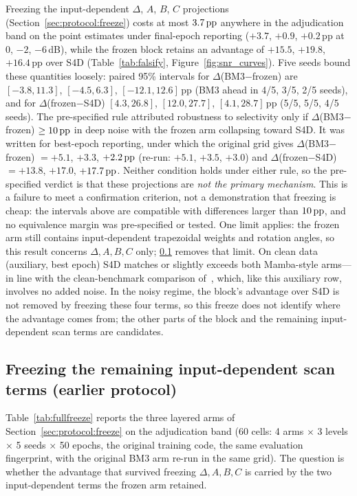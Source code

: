 Freezing the input-dependent $\Delta$, $A$, $B$, $C$ projections (Section~\ref{sec:protocol:freeze}) costs at most $3.7\,\mathrm{pp}$ anywhere in the adjudication band on the point estimates under final-epoch reporting ($+3.7$, $+0.9$, $+0.2$\,pp at $0$, $-2$, $-6$\,dB), while the frozen block retains an advantage of $+15.5$, $+19.8$, $+16.4$\,pp over S4D (Table~\ref{tab:falsify}, Figure~\ref{fig:snr_curves}). Five seeds bound these quantities loosely: paired 95\% intervals for $\Delta$(BM3$-$frozen) are $[-3.8, 11.3]$, $[-4.5, 6.3]$, $[-12.1, 12.6]$\,pp (BM3 ahead in 4/5, 3/5, 2/5 seeds), and for $\Delta$(frozen$-$S4D) $[4.3, 26.8]$, $[12.0, 27.7]$, $[4.1, 28.7]$\,pp (5/5, 5/5, 4/5 seeds). The pre-specified rule attributed robustness to selectivity only if $\Delta$(BM3$-$frozen) $\geq 10\,\mathrm{pp}$ in deep noise with the frozen arm collapsing toward S4D. It was written for best-epoch reporting, under which the original grid gives $\Delta$(BM3$-$frozen) $= +5.1$, $+3.3$, $+2.2\,\mathrm{pp}$ (re-run: $+5.1$, $+3.5$, $+3.0$) and $\Delta$(frozen$-$S4D) $= +13.8$, $+17.0$, $+17.7\,\mathrm{pp}$. Neither condition holds under either rule, so the pre-specified verdict is that these projections are \emph{not the primary mechanism}. This is a failure to meet a confirmation criterion, not a demonstration that freezing is cheap: the intervals above are compatible with differences larger than $10\,\mathrm{pp}$, and no equivalence margin was pre-specified or tested. One limit applies: the frozen arm still contains input-dependent trapezoidal weights and rotation angles, so this result concerns $\Delta, A, B, C$ only; \ref{sec:results:fullfreeze} removes that limit. On clean data (auxiliary, best epoch) S4D matches or slightly exceeds both Mamba-style arms---in line with the clean-benchmark comparison of~\cite{saadatmand2026s4d}, which, like this auxiliary row, involves no added noise. In the noisy regime, the block's advantage over S4D is not removed by freezing these four terms, so this freeze does not identify where the advantage comes from; the other parts of the block and the remaining input-dependent scan terms are candidates.

\subsection{Freezing the remaining input-dependent scan terms (earlier protocol)}
\label{sec:results:fullfreeze}

Table~\ref{tab:fullfreeze} reports the three layered arms of Section~\ref{sec:protocol:freeze} on the adjudication band (60 cells: 4 arms $\times$ 3 levels $\times$ 5 seeds $\times$ 50 epochs, the original training code, the same evaluation fingerprint, with the original BM3 arm re-run in the same grid). The question is whether the advantage that survived freezing $\Delta, A, B, C$ is carried by the two input-dependent terms the frozen arm retained.

